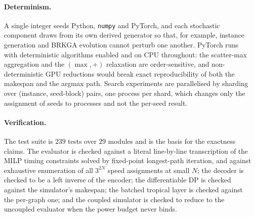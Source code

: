 \documentclass[11pt]{article}
\begin{document}
\paragraph{Determinism.} A single integer seeds Python, \texttt{numpy} and PyTorch, and each
stochastic component draws from its own derived generator so that, for example, instance
generation and BRKGA evolution cannot perturb one another. PyTorch runs with deterministic
algorithms enabled and on CPU throughout: the scatter-max aggregation and the $(\max,+)$
relaxation are order-sensitive, and non-deterministic GPU reductions would break exact
reproducibility of both the makespan and the argmax path. Search experiments are parallelised
by sharding over (instance, seed-block) pairs, one process per shard, which changes only the
assignment of seeds to processes and not the per-seed result.

\paragraph{Verification.} The test suite is $239$ tests over $29$ modules and is the basis
for the exactness claims. The evaluator is checked against a literal line-by-line
transcription of the MILP timing constraints solved by fixed-point longest-path iteration,
and against exhaustive enumeration of all $3^{2N}$ speed assignments at small $N$; the
decoder is checked to be a left inverse of the encoder; the differentiable DP is checked
against the simulator's makespan; the batched tropical layer is checked against the
per-graph one; and the coupled simulator is checked to reduce to the uncoupled evaluator when
the power budget never binds.
\end{document}
